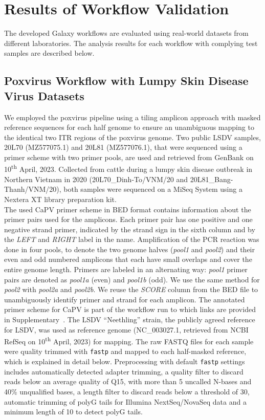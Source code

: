 \chapter{Results of Workflow Validation}\label{chap:results}
The developed Galaxy workflows are evaluated using real-world datasets from different laboratories. The analysis results for each workflow with complying test samples are described below.

\section{Poxvirus Workflow with Lumpy Skin Disease Virus Datasets}
We employed the poxvirus pipeline using a tiling amplicon approach with masked reference sequences for each half genome to ensure an unambiguous mapping to the identical two \ac{ITR} regions of the poxvirus genome. Two public \ac{LSDV} samples, 20L70 (MZ577075.1) and 20L81 (MZ577076.1), that were sequenced using a primer scheme with two primer pools, are used and retrieved from GenBank on 10\textsuperscript{th} April, 2023. Collected from cattle  during a lumpy skin disease outbreak in Northern Vietnam in 2020 (20L70\_Dinh-To/VNM/20 and 20L81\_Bang-Thanh/VNM/20), both samples were sequenced on a MiSeq System using a Nextera XT library preparation kit. \\
The used \acs{CaPV} primer scheme in \ac{BED} format contains information about the primer pairs used for the amplicons. Each primer pair has one positive and one negative strand primer, indicated by the strand sign in the sixth column and by the \textit{LEFT} and \textit{RIGHT} label in the name. Amplification of the \ac{PCR} reaction was done in four pools, to denote the two genome halves (\textit{pool1} and \textit{pool2}) and their even and odd numbered amplicons that each have small overlaps and cover the entire genome length. Primers are labeled in an alternating way: \textit{pool1} primer pairs are denoted as \textit{pool1a} (even) and \textit{pool1b} (odd). We use the same method for \textit{pool2} with \textit{pool2a} and \textit{pool2b}. We reuse the \textit{SCORE} column from the \ac{BED} file to unambiguously identify primer and strand for each amplicon. The annotated primer scheme for \ac{CaPV} is part of the workflow run to which links are provided in Supplementary~. The \ac{LSDV} ``Neethling'' strain, the publicly agreed reference for \ac{LSDV}, was used as reference genome (NC\_003027.1, retrieved from \ac{NCBI} RefSeq on 10\textsuperscript{th} April, 2023) for mapping. The raw FASTQ files for each sample were quality trimmed with \texttt{fastp} and mapped to each half-masked reference, which is explained in detail below. Preprocessing with default \texttt{fastp} settings includes automatically detected adapter trimming, a quality filter to discard reads below an average quality of Q15, with more than 5 uncalled N-bases and 40\% unqualified bases, a length filter to discard reads below a threshold of 30, automatic trimming of polyG tails for Illumina NextSeq/NovaSeq data and a minimum length of 10 to detect polyG tails.
\\


